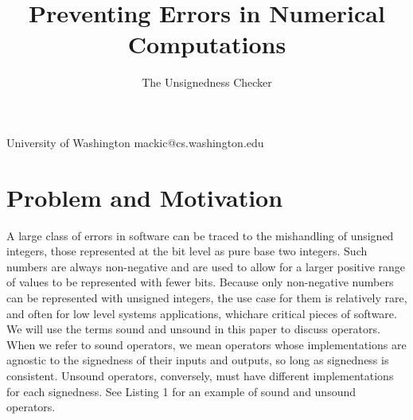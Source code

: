\documentclass{sigplanconf}
\begin{document}
\setlength{\pdfpageheight}{\paperheight}
\setlength{\pdfpagewidth}{\paperwidth}

\title{Preventing Errors in Numerical Computations}
\subtitle{The Unsignedness Checker}

           {University of Washington}
           {mackic@cs.washington.edu}

\maketitle


\section{Problem and Motivation}

A large class of errors in software can be traced to the mishandling of unsigned integers, those represented at the bit level as pure base two integers. Such numbers are always non-negative and are used to allow for a larger positive range of values to be represented with fewer bits. Because only non-negative numbers can be represented with unsigned integers, the use case for them is relatively rare, and often for low level systems applications, whichare critical pieces of software.\\
\indent
We will use the terms sound and unsound in this paper to discuss operators. When we refer to sound operators, we mean operators whose implementations are agnostic to the signedness of their inputs and outputs, so long as signedness is consistent. Unsound operators, conversely, must have different implementations for each signedness. See Listing 1 for an example of sound and unsound operators.\\
\end{document}
